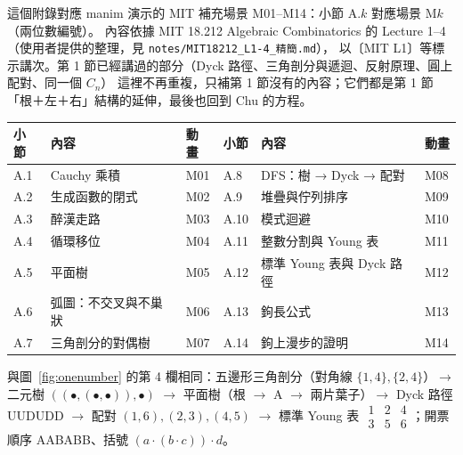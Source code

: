 \documentclass[11pt,a4paper]{article}
\begin{document}
這個附錄對應 manim 演示的 MIT 補充場景 M01--M14：小節 A.$k$ 對應場景 M$k$（兩位數編號）。
內容依據 MIT 18.212 Algebraic Combinatorics 的 Lecture 1--4（使用者提供的整理，見 \texttt{notes/MIT18212\_L1-4\_精簡.md}），
以〔MIT L1〕等標示講次。第 1 節已經講過的部分（Dyck 路徑、三角剖分與遞迴、反射原理、圓上配對、同一個 $C_n$）
這裡不再重複，只補第 1 節沒有的內容；它們都是第 1 節「根＋左＋右」結構的延伸，最後也回到 Chu 的方程。

\begin{center}
\small
\begin{tabular}{@{}lll@{\qquad}lll@{}}
\toprule
小節 & 內容 & 動畫 & 小節 & 內容 & 動畫\\
\midrule
A.1 & Cauchy 乘積 & M01 & A.8 & DFS：樹 → Dyck → 配對 & M08\\
A.2 & 生成函數的閉式 & M02 & A.9 & 堆疊與佇列排序 & M09\\
A.3 & 醉漢走路 & M03 & A.10 & 模式迴避 & M10\\
A.4 & 循環移位 & M04 & A.11 & 整數分割與 Young 表 & M11\\
A.5 & 平面樹 & M05 & A.12 & 標準 Young 表與 Dyck 路徑 & M12\\
A.6 & 弧圖：不交叉與不巢狀 & M06 & A.13 & 鉤長公式 & M13\\
A.7 & 三角剖分的對偶樹 & M07 & A.14 & 鉤上漫步的證明 & M14\\
\bottomrule
\end{tabular}
\end{center}

\begin{keybox}[貫穿的例子]
與圖~\ref{fig:onenumber} 的第 4 欄相同：五邊形三角剖分（對角線 $\{1,4\},\{2,4\}$）$\to$ 二元樹 $((\bullet,(\bullet,\bullet)),\bullet)$
$\to$ 平面樹（根 $\to$ A $\to$ 兩片葉子）$\to$ Dyck 路徑 UUDUDD $\to$ 配對 $(1,6),(2,3),(4,5)$
$\to$ 標準 Young 表 $\begin{smallmatrix}1&2&4\\3&5&6\end{smallmatrix}$；開票順序 AABABB、括號 $(a\cdot(b\cdot c))\cdot d$。
\end{keybox}





\end{document}
